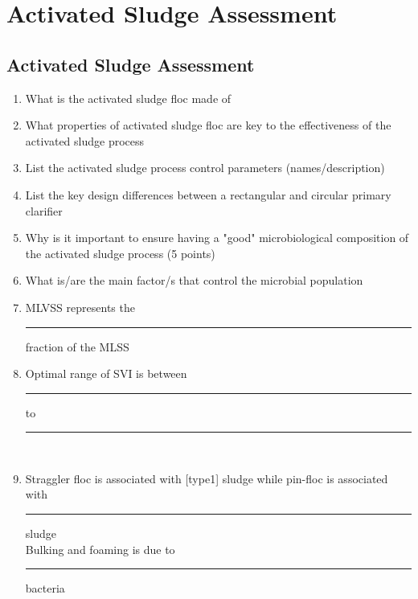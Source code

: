 
\chapter{Activated Sludge Assessment}

\section*{Activated Sludge Assessment}
\begin{enumerate}
\item What is the activated sludge floc made of\\

\item What properties of activated sludge floc are key to the effectiveness of the activated sludge process\\

\item List the activated sludge process control parameters (names/description)\\

\item List the key design differences between a rectangular and circular primary clarifier\\

\item Why is it important to ensure having a "good" microbiological composition of the activated sludge process (5 points)\\

\item What is/are the main factor/s that control the microbial population\\

\item MLVSS represents the \rule{1.5cm}{0.3mm}  fraction of the MLSS\\

\item Optimal range of SVI is between \rule{1.5cm}{0.3mm} to \rule{1.5cm}{0.3mm} \\

\item Straggler floc is associated with [type1] sludge while pin-floc is associated with \rule{1.5cm}{0.3mm}  sludge\\
Bulking and foaming is due to\rule{1.5cm}{0.3mm} bacteria\\


\end{enumerate}
